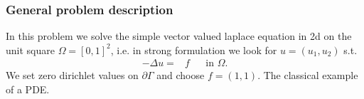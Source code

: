 \subsubsection{General problem description}
In this problem we solve the simple vector valued laplace equation in 2d
on the unit square $\Omega=[0,1]^2$, i.e. in strong formulation we look for $u=(u_1,u_2)$ s.t.
\begin{align*}
-\Delta u =& f &&\text{in }\Omega.
\end{align*}
We set zero dirichlet values on $\partial \Gamma$ and choose $f=(1,1)$. The classical example of a PDE.

